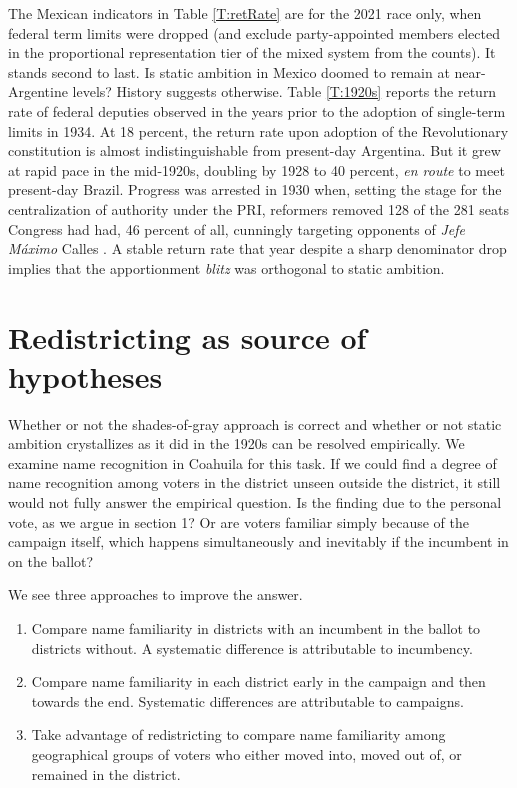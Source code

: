 \documentclass[letter,12pt]{article}
\begin{document}
The Mexican indicators in Table \ref{T:retRate} are for the 2021 race only, when federal term limits were dropped (and exclude party-appointed members elected in the proportional representation tier of the mixed system from the counts). It stands second to last. Is static ambition in Mexico doomed to remain at near-Argentine levels? History suggests otherwise. Table \ref{T:1920s} reports the return rate of federal deputies observed in the years prior to the adoption of single-term limits in 1934. At 18 percent, the return rate upon adoption of the Revolutionary constitution is almost indistinguishable from present-day Argentina. But it grew at rapid pace in the mid-1920s, doubling by 1928 to 40 percent, \emph{en route} to meet present-day Brazil. Progress was arrested in 1930 when, setting the stage for the centralization of authority under the PRI, reformers removed 128 of the 281 seats Congress had had, 46 percent of all, cunningly targeting opponents of \emph{Jefe Máximo} Calles \citep[see][:23]{godoy.reeleccion.2014}. A stable return rate that year despite a sharp denominator drop implies that the apportionment \emph{blitz} was orthogonal to static ambition.

\section{Redistricting as source of hypotheses}

Whether or not the shades-of-gray approach is correct and whether or not static ambition crystallizes as it did in the 1920s can be resolved empirically. We examine name recognition in Coahuila for this task. If we could find a degree of name recognition among voters in the district unseen outside the district, it still would not fully answer the empirical question. Is the finding due to the personal vote, as we argue in section 1? Or are voters familiar simply because of the campaign itself, which happens simultaneously and inevitably if the incumbent in on the ballot?

We see three approaches to improve the answer.

\begin{enumerate}
\item Compare name familiarity in districts with an incumbent in the ballot to districts without. A systematic difference is attributable to incumbency.
\item Compare name familiarity in each district early in the campaign and then towards the end. Systematic differences are attributable to campaigns. 
\item Take advantage of redistricting to compare name familiarity among geographical groups of voters who either moved into, moved out of, or remained in the district.
\end{enumerate}
\end{document}
